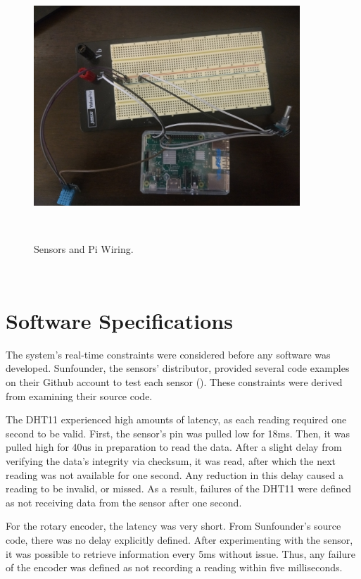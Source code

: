 \documentclass[letterpaper, 12pt]{article}
\begin{document}
\begin{figure}[H]
	\centering
	\includegraphics[width=10cm,height=10cm,keepaspectratio]{circuit.jpg}
	\caption[Ciruit]{Sensors and Pi Wiring.}
	\label{fig:Circuit}
\end{figure}
~\newline
\section{Software Specifications}
The system's real-time constraints were considered before any software was developed.  Sunfounder, the sensors' distributor, provided several code examples on their Github account to test each sensor (\cite{sunfounder2018}).  These constraints were derived from examining their source code.
  
\indent The DHT11 experienced high amounts of latency, as each reading required one second to be valid.  First, the sensor's pin was pulled low for 18ms. Then, it was pulled high for 40us in preparation to read the data.  After a slight delay from verifying the data's integrity via checksum, it was read, after which the next reading was not available for one second.  Any reduction in this delay caused a reading to be invalid, or missed.  As a result, failures of the DHT11 were defined as not receiving data from the sensor after one second.

\indent For the rotary encoder, the latency was very short.  From Sunfounder's source code, there was no delay explicitly defined.  After experimenting with the sensor, it was possible to retrieve information every 5ms without issue.  Thus, any failure of the encoder was defined as not recording a reading within five milliseconds.
\end{document}
